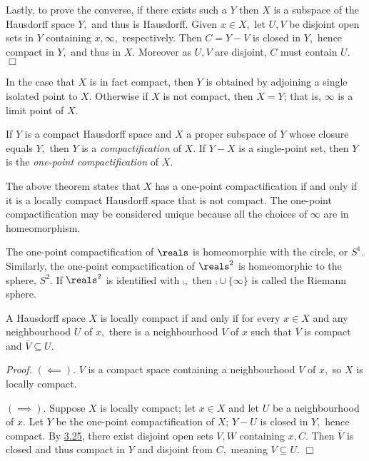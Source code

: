 Lastly, to prove the converse, if there exists such a $Y$ then $X$ is a subspace of the Hausdorff space $Y,$ and thus is Hausdorff. Given $x \in X,$ let $U, V$ be disjoint open sets in $Y$ containing $x, \infty,$ respectively. Then $C=Y-V$ is closed in $Y,$ hence compact in $Y,$ and thus in $X$. Moreover as $U, V$ are disjoint, $C$ must contain $U.$ $\Box$

In the case that $X$ is in fact compact, then $Y$ is obtained by adjoining a single isolated point to $X.$ Otherwise if $X$ is not compact, then $\overline{X} = Y$; that is, $\infty$ is a limit point of $X.$

\begin{definition}\label{3.51}
    If $Y$ is a compact Hausdorff space and $X$ a proper subspace of $Y$ whose closure equals $Y,$ then $Y$ is a {\it compactification} of $X.$ If $Y-X$ is a single-point set, then $Y$ is the {\it one-point compactification} of $X.$
\end{definition}

The above theorem states that $X$ has a one-point compactification if and only if it is a locally compact Hausdorff space that is not compact. The one-point compactification may be considered unique because all the choices of $\infty$ are in homeomorphism.

The one-point compactification of $\reals$ is homeomorphic with the circle, or $S^1$. Similarly, the one-point compactification of $\reals^2$ is homeomorphic to the sphere, $S^2$. If $\reals^2$ is identified with $\comp,$ then $\comp \cup\{\infty\}$ is called the Riemann sphere.

\begin{theorem}\label{3.52}
    A Hausdorff space $X$ is locally compact if and only if for every $x \in X$ and any neighbourhood $U$ of $x,$ there is a neighbourhood $V$ of $x$ such that $\overline{V}$ is compact and $\overline{V} \subseteq U.$
\end{theorem}
{\it Proof.} $(\impliedby)$. $\overline{V}$ is a compact space containing a neighbourhood $V$ of $x,$ so $X$ is locally compact.

$(\implies)$. Suppose $X$ is locally compact; let $x \in X$ and let $U$ be a neighbourhood of $x.$ Let $Y$ be the one-point compactification of $X$; $Y-U$ is closed in $Y,$ hence compact. By \hyperref[3.25]{3.25}, there exist disjoint open sets $V, W$ containing $x, C.$ Then $\overline{V}$ is closed and thus compact in $Y$ and disjoint from $C,$ meaning $\overline{V} \subseteq U.$ $\Box$

